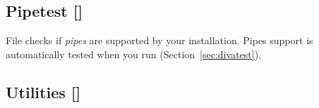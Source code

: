 \subsection[Pipetest]{Pipetest []}

File  checks if \textit{pipes} are supported by your \diva installation. Pipes support is automatically tested when you run  (Section~\ref{sec:divatest}).

\subsection[Utilities]{Utilities []}

